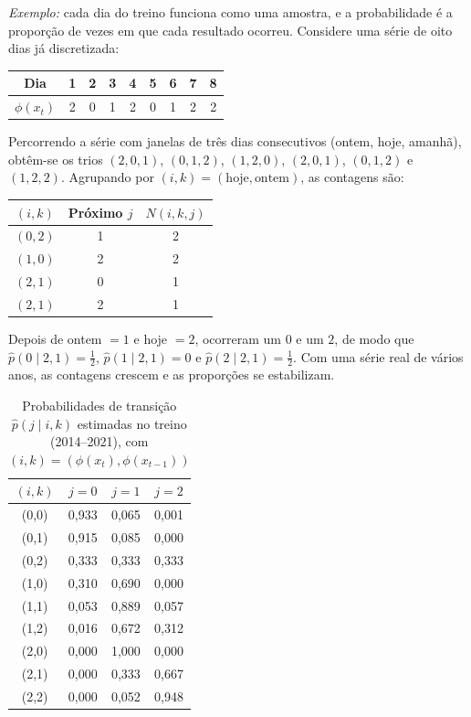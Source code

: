 \documentclass[conference]{IEEEtran}
\begin{document}
\textit{Exemplo:} cada dia do treino funciona como uma amostra, e a probabilidade é a proporção de vezes em que cada resultado ocorreu. Considere uma série de oito dias já discretizada:
\begin{center}
  \footnotesize
  \begin{tabular}{c|cccccccc}
    Dia & 1 & 2 & 3 & 4 & 5 & 6 & 7 & 8 \\
    \hline
    $\phi(x_t)$ & 2 & 0 & 1 & 2 & 0 & 1 & 2 & 2
  \end{tabular}
\end{center}
Percorrendo a série com janelas de três dias consecutivos (ontem, hoje, amanhã), obtêm-se os trios $(2,0,1)$, $(0,1,2)$, $(1,2,0)$, $(2,0,1)$, $(0,1,2)$ e $(1,2,2)$. Agrupando por $(i,k) = (\text{hoje}, \text{ontem})$, as contagens são:
\begin{center}
  \footnotesize
  \begin{tabular}{ccc}
    $(i,k)$ & Próximo $j$ & $N(i,k,j)$ \\
    \hline
    $(0,2)$ & 1 & 2 \\
    $(1,0)$ & 2 & 2 \\
    $(2,1)$ & 0 & 1 \\
    $(2,1)$ & 2 & 1
  \end{tabular}
\end{center}
Depois de ontem $= 1$ e hoje $= 2$, ocorreram um $0$ e um $2$, de modo que $\hat{p}(0 \mid 2,1) = \tfrac{1}{2}$, $\hat{p}(1 \mid 2,1) = 0$ e $\hat{p}(2 \mid 2,1) = \tfrac{1}{2}$. Com uma série real de vários anos, as contagens crescem e as proporções se estabilizam.

\begin{table}[!t]
  \centering
  \caption{Probabilidades de transição $\hat{p}(j \mid i,k)$ estimadas no treino (2014--2021), com $(i,k) = (\phi(x_t), \phi(x_{t-1}))$}
  \label{tab:phat}
  \footnotesize
  \renewcommand{\arraystretch}{1.1}
  \begin{tabular}{c ccc}
    \toprule
    $(i,k)$ & $j = 0$ & $j = 1$ & $j = 2$ \\
    \midrule
    (0,0) & 0,933 & 0,065 & 0,001 \\
    (0,1) & 0,915 & 0,085 & 0,000 \\
    (0,2) & 0,333 & 0,333 & 0,333 \\
    \midrule
    (1,0) & 0,310 & 0,690 & 0,000 \\
    (1,1) & 0,053 & 0,889 & 0,057 \\
    (1,2) & 0,016 & 0,672 & 0,312 \\
    \midrule
    (2,0) & 0,000 & 1,000 & 0,000 \\
    (2,1) & 0,000 & 0,333 & 0,667 \\
    (2,2) & 0,000 & 0,052 & 0,948 \\
    \bottomrule
  \end{tabular}
\end{table}
\end{document}
